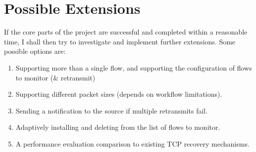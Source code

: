 \section*{\fontsize{18pt}{1}\selectfont Possible Extensions}

If the core parts of the project are successful and completed within a reasonable time, I shall then try to investigate and implement further extensions. Some possible options are:

\begin{enumerate}
	\item Supporting more than a single flow, and supporting the configuration of flows to monitor (\& retransmit)
	
	\item Supporting different packet sizes (depends on workflow limitations).
	
	\item Sending a notification to the source if multiple retransmits fail.
	
	\item Adaptively installing and deleting from the list of flows to monitor.
	
	\item A performance evaluation comparison to existing TCP recovery mechanisms.
\end{enumerate}